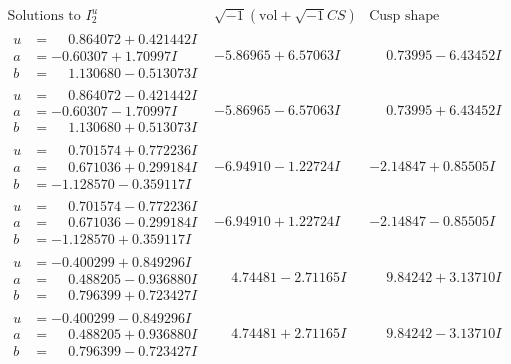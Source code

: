 \documentclass[1p]{elsarticle_modified}
\theoremstyle{definition}
\newcommand{\I}{\sqrt{-1}}
\begin{document}
$$\begin{array}{c|c|c}  
\text{Solutions to }I^u_{2}& \I (\text{vol} + \sqrt{-1}CS) & \text{Cusp shape}\\
 \hline 
\begin{aligned}
u &= \phantom{-}0.864072 + 0.421442 I \\
a &= -0.60307 + 1.70997 I \\
b &= \phantom{-}1.130680 - 0.513073 I\end{aligned}
 & -5.86965 + 6.57063 I & \phantom{-}0.73995 - 6.43452 I \\ \hline\begin{aligned}
u &= \phantom{-}0.864072 - 0.421442 I \\
a &= -0.60307 - 1.70997 I \\
b &= \phantom{-}1.130680 + 0.513073 I\end{aligned}
 & -5.86965 - 6.57063 I & \phantom{-}0.73995 + 6.43452 I \\ \hline\begin{aligned}
u &= \phantom{-}0.701574 + 0.772236 I \\
a &= \phantom{-}0.671036 + 0.299184 I \\
b &= -1.128570 - 0.359117 I\end{aligned}
 & -6.94910 - 1.22724 I & -2.14847 + 0.85505 I \\ \hline\begin{aligned}
u &= \phantom{-}0.701574 - 0.772236 I \\
a &= \phantom{-}0.671036 - 0.299184 I \\
b &= -1.128570 + 0.359117 I\end{aligned}
 & -6.94910 + 1.22724 I & -2.14847 - 0.85505 I \\ \hline\begin{aligned}
u &= -0.400299 + 0.849296 I \\
a &= \phantom{-}0.488205 - 0.936880 I \\
b &= \phantom{-}0.796399 + 0.723427 I\end{aligned}
 & \phantom{-}4.74481 - 2.71165 I & \phantom{-}9.84242 + 3.13710 I \\ \hline\begin{aligned}
u &= -0.400299 - 0.849296 I \\
a &= \phantom{-}0.488205 + 0.936880 I \\
b &= \phantom{-}0.796399 - 0.723427 I\end{aligned}
 & \phantom{-}4.74481 + 2.71165 I & \phantom{-}9.84242 - 3.13710 I \\ \hline\begin{aligned}

\end{aligned}
\end{array}$$
\end{document}
